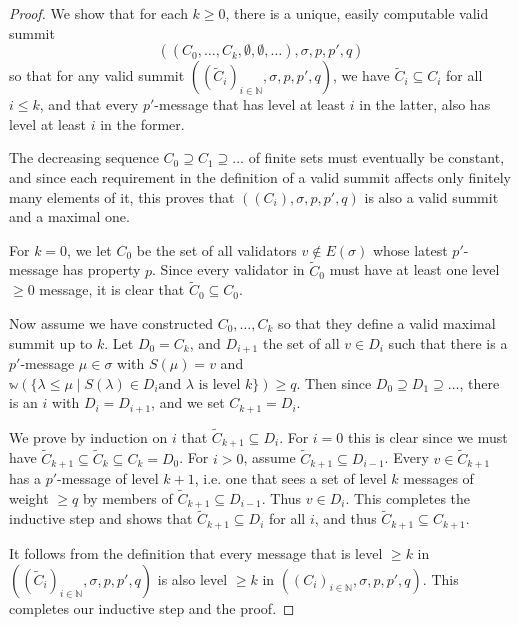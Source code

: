 \documentclass[12pt, fleqn]{article}
\newcommand{\ww}{\mathbb{w}}
\begin{document}
\begin{proof}
  We show that for each $k \geq 0$, there is a unique, easily computable valid summit
  $$((C_0, \ldots, C_k, \emptyset, \emptyset, \ldots), \sigma, p, p', q)$$
  so that for any valid summit $((\tilde{C}_i)_{i \in \mathbb{N}}, \sigma, p, p', q)$, we have $\tilde{C}_i \subseteq C_i$ for all $i \leq k$, and that every $p'$-message that has level at least $i$ in the latter, also has level at least $i$ in the former.

  The decreasing sequence $C_0 \supseteq C_1 \supseteq \ldots$ of finite sets must eventually be constant, and since each requirement in the definition of a valid summit affects only finitely many elements of it, this proves that $((C_i), \sigma, p, p', q)$ is also a valid summit and a maximal one.

  For $k = 0$, we let $C_0$ be the set of all validators $v \notin E(\sigma)$ whose latest $p'$-message has property $p$. Since every validator in $\tilde{C}_0$ must have at least one level $\geq 0$ message, it is clear that $\tilde{C}_0 \subseteq C_0$.

  Now assume we have constructed $C_0, \ldots, C_k$ so that they define a valid maximal summit up to $k$. Let $D_0 = C_k$, and $D_{i + 1}$ the set of all $v \in D_i$ such that there is a $p'$-message $\mu \in \sigma$ with $S(\mu) = v$ and $\ww(\{\lambda \leq \mu \mid S(\lambda) \in D_i \text{and $\lambda$ is level $k$}\}) \geq q$. Then since $D_0 \supseteq D_1 \supseteq \ldots$, there is an $i$ with $D_i = D_{i+1}$, and we set $C_{k + 1} = D_i$.

  We prove by induction on $i$ that $\tilde{C}_{k + 1} \subseteq D_i$. For $i = 0$ this is clear since we must have $\tilde{C}_{k + 1} \subseteq \tilde{C}_k \subseteq C_k = D_0$. For $i > 0$, assume $\tilde{C}_{k + 1} \subseteq D_{i - 1}$. Every $v \in \tilde{C}_{k + 1}$ has a $p'$-message of level $k + 1$, i.e. one that sees a set of level $k$ messages of weight $\geq q$ by members of $\tilde{C}_{k + 1} \subseteq D_{i - 1}$. Thus $v \in D_i$. This completes the inductive step and shows that $\tilde{C}_{k + 1} \subseteq D_i$ for all $i$, and thus $\tilde{C}_{k + 1} \subseteq C_{k + 1}$.

  It follows from the definition that every message that is level $\geq k$ in $((\tilde{C}_i)_{i \in \mathbb{N}}, \sigma, p, p', q)$ is also level $\geq k$ in $((C_i)_{i \in \mathbb{N}}, \sigma, p, p', q)$. This completes our inductive step and the proof.
\end{proof}
\end{document}
